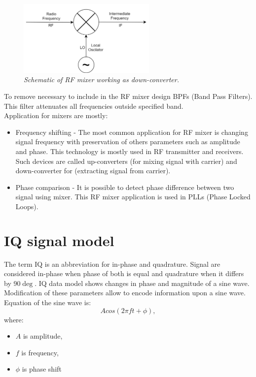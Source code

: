 \documentclass[en,printmode]{mgr}
\begin{document}
		\begin{figure}[!htb]
    		\centering
   			\includegraphics[width=0.6\textwidth]{diag/downmx.png}
    		\caption{\textit{Schematic of RF mixer working as down-converter.}}
		\end{figure}
		
		To remove necessary to include in the RF mixer design BPFs (Band Pass Filters). This filter
		attenuates all frequencies outside specified band.
		\\
		
		Application for mixers are mostly:
		\begin{itemize}
			\item Frequency shifting - The most common application for RF mixer is changing signal frequency
			with preservation of others parameters such as amplitude and phase.
			This technology is mostly used in RF transmitter and receivers.
			Such devices are called up-converters (for mixing signal with carrier) and down-converter for
			(extracting signal from carrier).
			\item Phase comparison - It is possible to detect phase difference between two signal using mixer.
			This RF mixer application is used in PLLs (Phase Locked Loops).
		\end{itemize}
	
	\section{IQ signal model}
			The term IQ is an abbreviation for in-phase and quadrature. Signal are considered in-phase when phase
		of both is equal and quadrature when it differs by 90$\deg$. IQ data model shows changes in phase and
		magnitude of a sine wave. Modification of these parameters allow to encode information upon a sine wave.
		\\
		
		\noindent				
		Equation of the sine wave is:
		\[
			A cos\left(2\pi f t+ \phi\right), \label{eq:sinewave}
		\]
		where:
		\begin{itemize}
			\item $A$ is amplitude,
			\item $f$ is frequency,
			\item $\phi$ is phase shift
		\end{itemize}
		
\end{document}

